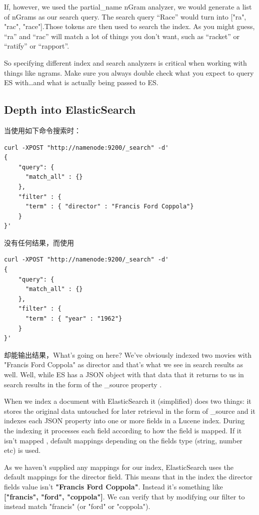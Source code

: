\par If, however, we used the partial\_name nGram analyzer, we would generate a list of nGrams as our search query. The search query “Race” would turn into ["ra", "rac", "race"].Those tokens are then used to search the index. As you might guess, “ra” and “rac” will match a lot of things you don’t want, such as “racket” or “ratify” or “rapport”.
\par So specifying different index and search analyzers is critical when working with things like ngrams. Make sure you always double check what you expect to query ES with…and what is actually being passed to ES.
\subsection{Depth into ElasticSearch}
\par 当使用如下命令搜索时：
\begin{verbatim}
curl -XPOST "http://namenode:9200/_search" -d'
{
    "query": {
      "match_all" : {}
    },
    "filter" : {
      "term" : { "director" : "Francis Ford Coppola"}
    }
}'
\end{verbatim}
没有任何结果，而使用
\begin{verbatim}
curl -XPOST "http://namenode:9200/_search" -d'
{
    "query": {
      "match_all" : {}
    },
    "filter" : {
      "term" : { "year" : "1962"}
    }
}'
\end{verbatim}
\par 却能输出结果，What's going on here?  We've obviously indexed two movies with "Francis Ford Coppola" as director and that's what we see in search results as well. Well, while ES has a JSON object with that data that it returns to us in search results in the form of the \_source property .
\par When we index a document with ElasticSearch it (simplified) does two things: it stores the original data untouched for later retrieval in the form of \_source and it indexes each JSON property into one or more fields in a Lucene index. During the indexing it processes each field according to how the field is mapped. If it isn't mapped , default mappings depending on the fields type (string, number etc) is used.
\par As we haven't supplied any mappings for our index, ElasticSearch uses the default mappings for the director field. This means that in the index the director fields value isn't \textbf{"Francis Ford Coppola"}. Instead it's something like \textbf{["francis", "ford", "coppola"]}. We can verify that by modifying our filter to instead match "francis" (or "ford" or "coppola").
